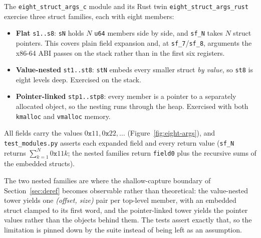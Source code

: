 \documentclass{article}
\begin{document}
The \texttt{eight\_struct\_args\_c} module and its Rust twin
\texttt{eight\_struct\_args\_rust} exercise three struct families, each with
eight members:
\begin{itemize}[nosep]
  \item \textbf{Flat} \texttt{s1..s8}: \texttt{sN} holds $N$ \texttt{u64}
        members side by side, and \texttt{sf\_N} takes $N$ struct pointers.
        This covers plain field expansion and, at \texttt{sf\_7}/\texttt{sf\_8},
        arguments the x86-64 ABI passes on the stack rather than in the first
        six registers.
  \item \textbf{Value-nested} \texttt{st1..st8}: \texttt{stN} embeds every
        smaller struct \emph{by value}, so \texttt{st8} is eight levels deep.
        Exercised on the stack.
  \item \textbf{Pointer-linked} \texttt{stp1..stp8}: every member is a pointer
        to a separately allocated object, so the nesting runs through the heap.
        Exercised with both \texttt{kmalloc} and \texttt{vmalloc} memory.
\end{itemize}
All fields carry the values $0\mathtt{x}11, 0\mathtt{x}22, \ldots$ (Figure~\ref{fig:eight-args}), and
\texttt{test\_modules.py} asserts each expanded field and every return value
(\texttt{sf\_N} returns $\sum_{k=1}^{N} 0\mathtt{x}11k$; the nested families
return \texttt{field0} plus the recursive sums of the embedded structs).

The two nested families are where the shallow-capture boundary of
Section~\ref{sec:deref} becomes observable rather than theoretical: the
value-nested tower yields one \emph{(offset, size)} pair per top-level member,
with an embedded struct clamped to its first word, and the pointer-linked tower
yields the pointer values rather than the objects behind them. The tests assert
exactly that, so the limitation is pinned down by the suite instead of being
left as an assumption.
\end{document}
